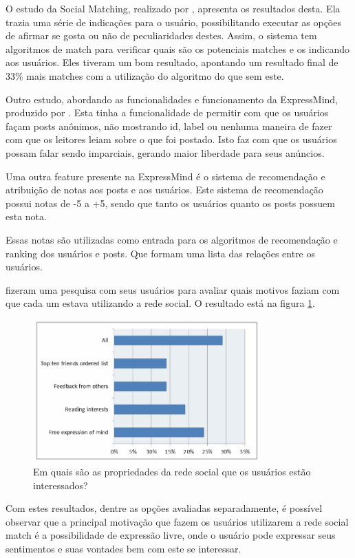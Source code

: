 O estudo da Social Matching, realizado por \cite{expressmind},
apresenta os resultados desta. Ela trazia uma série de indicações para o usuário,
possibilitando executar as opções de afirmar se gosta ou não de peculiaridades
destes. Assim, o sistema tem algoritmos de match para verificar quais são
os potenciais matches e os indicando aos usuários. Eles tiveram um bom resultado,
apontando um resultado final de 33\% mais matches com a utilização do algoritmo
do que sem este.

Outro estudo, abordando as funcionalidades e funcionamento da ExpressMind,
produzido por \cite{expressmind}. Esta tinha a funcionalidade
de  permitir com que os usuários façam posts anônimos, não mostrando id, label ou nenhuma
maneira de fazer com que os leitores leiam sobre o que foi postado. Isto faz com que os
usuários possam falar sendo imparciais, gerando maior liberdade para
seus anúncios.

Uma outra feature presente na ExpressMind é o sistema de recomendação e atribuição
de notas aos posts e aos usuários. Este sistema de recomendação possui notas
de -5 a +5, sendo que tanto os usuários quanto os posts possuem esta nota.

Essas notas são utilizadas como entrada para os algoritmos de recomendação e
ranking dos usuários e posts. Que formam uma lista das relações entre
os usuários.

\cite{expressmind} fizeram uma pesquisa com seus usuários
para avaliar quais motivos faziam com que cada um estava utilizando a rede social. 
O resultado está na figura \ref{fig:expressmind}.


\begin{figure}[h]
    \centering
    \includegraphics[width=330px, scale=1]{figuras/expressmind}
    \caption{Em quais são as propriedades da rede social que os usuários estão interessados?}
    \label{fig:expressmind}
\end{figure}

Com estes resultados, dentre as opções avaliadas separadamente, é possível
observar que a principal motivação que fazem os usuários utilizarem a rede social match
é a possibilidade de expressão livre, onde o usuário pode expressar seus sentimentos
e suas vontades bem com este se interessar.

